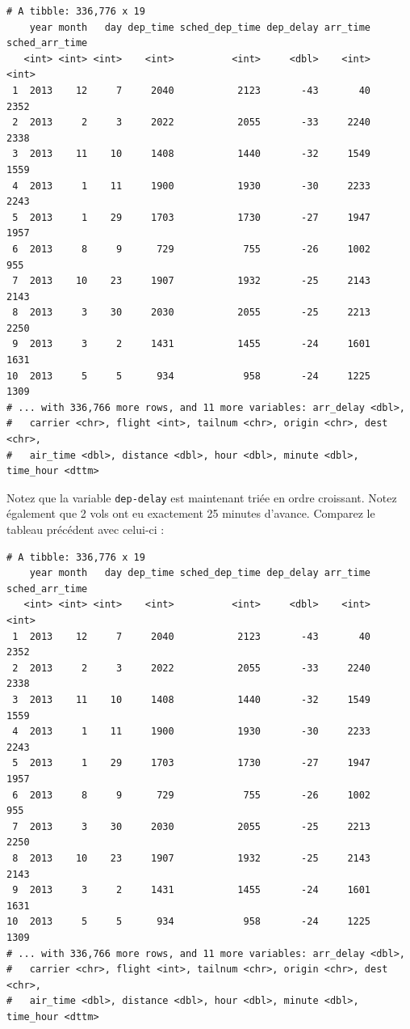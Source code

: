 \documentclass[a4paperpaper,]{article}
\newenvironment{Shaded}{\begin{snugshade}}{\end{snugshade}}
\newcommand{\KeywordTok}[1]{\textcolor[rgb]{0.12,0.11,0.11}{\textbf{#1}}}
\newcommand{\NormalTok}[1]{\textcolor[rgb]{0.12,0.11,0.11}{#1}}
\newcommand{\OperatorTok}[1]{\textcolor[rgb]{0.12,0.11,0.11}{#1}}
\newcommand{\StringTok}[1]{\textcolor[rgb]{0.75,0.01,0.01}{#1}}
\theoremstyle{definition}
\theoremstyle{definition}
\theoremstyle{definition}
\theoremstyle{remark}
\begin{document}
\begin{verbatim}
# A tibble: 336,776 x 19
    year month   day dep_time sched_dep_time dep_delay arr_time sched_arr_time
   <int> <int> <int>    <int>          <int>     <dbl>    <int>          <int>
 1  2013    12     7     2040           2123       -43       40           2352
 2  2013     2     3     2022           2055       -33     2240           2338
 3  2013    11    10     1408           1440       -32     1549           1559
 4  2013     1    11     1900           1930       -30     2233           2243
 5  2013     1    29     1703           1730       -27     1947           1957
 6  2013     8     9      729            755       -26     1002            955
 7  2013    10    23     1907           1932       -25     2143           2143
 8  2013     3    30     2030           2055       -25     2213           2250
 9  2013     3     2     1431           1455       -24     1601           1631
10  2013     5     5      934            958       -24     1225           1309
# ... with 336,766 more rows, and 11 more variables: arr_delay <dbl>,
#   carrier <chr>, flight <int>, tailnum <chr>, origin <chr>, dest <chr>,
#   air_time <dbl>, distance <dbl>, hour <dbl>, minute <dbl>, time_hour <dttm>
\end{verbatim}

Notez que la variable \texttt{dep-delay} est maintenant triée en ordre
croissant. Notez également que 2 vols ont eu exactement 25 minutes
d'avance. Comparez le tableau précédent avec celui-ci :

\begin{Shaded}
\end{Shaded}

\begin{verbatim}
# A tibble: 336,776 x 19
    year month   day dep_time sched_dep_time dep_delay arr_time sched_arr_time
   <int> <int> <int>    <int>          <int>     <dbl>    <int>          <int>
 1  2013    12     7     2040           2123       -43       40           2352
 2  2013     2     3     2022           2055       -33     2240           2338
 3  2013    11    10     1408           1440       -32     1549           1559
 4  2013     1    11     1900           1930       -30     2233           2243
 5  2013     1    29     1703           1730       -27     1947           1957
 6  2013     8     9      729            755       -26     1002            955
 7  2013     3    30     2030           2055       -25     2213           2250
 8  2013    10    23     1907           1932       -25     2143           2143
 9  2013     3     2     1431           1455       -24     1601           1631
10  2013     5     5      934            958       -24     1225           1309
# ... with 336,766 more rows, and 11 more variables: arr_delay <dbl>,
#   carrier <chr>, flight <int>, tailnum <chr>, origin <chr>, dest <chr>,
#   air_time <dbl>, distance <dbl>, hour <dbl>, minute <dbl>, time_hour <dttm>
\end{verbatim}
\end{document}
